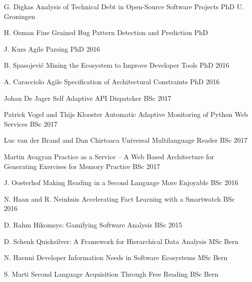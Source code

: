 \begin{enumerate}

\super 
	{G. Digkas}
	{Analysis of Technical Debt in Open-Source Software Projects}
	{PhD}
	{U. Groningen}
	{}

	

\super 
	{H. Osman}
	{Fine Grained Bug Pattern Detection and Prediction}
	{PhD}
	{\Bern}
	{\inprogrcosup}	

\super 
	{J. Kurs}
	{Agile Parsing}
	{PhD}
	{\Bern}
	{2016 }
	
\super 
	{B. Spasojevi\'{c}}
	{Mining the Ecosystem to Improve Developer Tools}
	{PhD}
	{\Bern}
	{2016 }


\super 
	{A. Caracciolo}
	{Agile Specification of Architectural Constraints}
	{PhD}
	{\Bern}
	{2016 }

\super 
	{Johan De Jager}
	{Self Adaptive API Dispatcher}
	{BSc}
	{\Groningen}
	{2017 \detail{\inprogr }}

\super 
	{Patrick Vogel and Thijs Klooster}
	{Automatic Adaptive Monitoring of Python Web Services}
	{BSc}
	{\Groningen}
	{2017 }

\super 
	{Luc van der Brand and Dan Chirtoaca}
	{Universal Multilanguage Reader}
	{BSc}
	{\Groningen}
	{2017 \detail{\inprogr }}

\super 
	{Martin Avagyan}
	{Practice as a Service -- A Web Based Architecture for Generating Exercises for Memory Practice}
	{BSc}
	{\Groningen}
	{2017 \detail{\inprogr }}


\super 
	{J. Oosterhof}
	{Making Reading in a Second Language More Enjoyable}
	{BSc}
	{\Groningen}
	{2016}

\super 
	{N. Haan and R. Neinhuis}
	{Accelerating Fact Learning with a Smartwatch}
	{BSc}
	{\Groningen}
	{2016}


\super 
	{D. Rahm}
	{Hikomsys: Gamifying Software Analysis}
	{BSc}
	{\Bern}
	{2015}


\super 
	{D. Schenk}
	{Quicksilver: A Framework for Hierarchical Data Analysis}
	{MSc}
	{Bern}
	{}

\super 
	{N. Haenni}
	{Developer Information Needs in Software Ecosystems}
	{MSc}
	{Bern}
	{}

\super 
	{S. Marti}
	{Second Language Acquisition Through Free Reading}
	{BSc}
	{Bern}
	{}


\end{enumerate}
